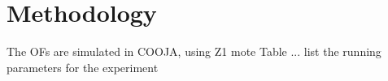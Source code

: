 \section{Methodology}

The OFs are simulated in COOJA, using Z1 mote
Table ... list the running parameters for the experiment